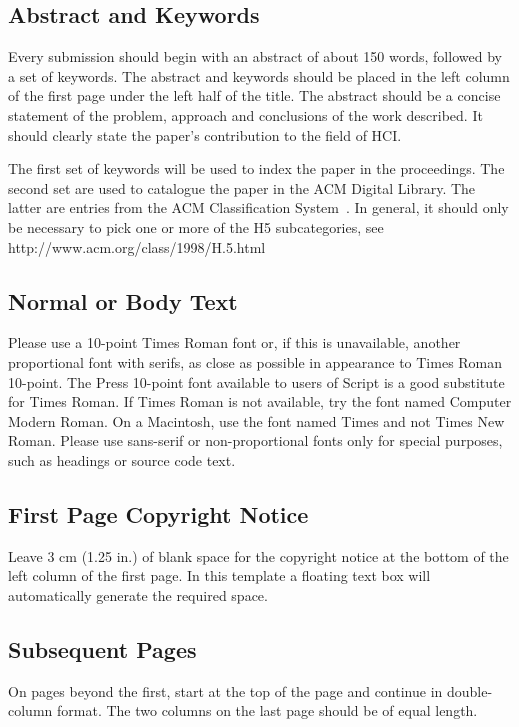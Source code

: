 \documentclass{chi2009}
\begin{document}
\subsection{Abstract and Keywords}

Every submission should begin with an abstract of about 150 words,
followed by a set of keywords. The abstract and keywords should be
placed in the left column of the first page under the left half of the
title. The abstract should be a concise statement of the problem,
approach and conclusions of the work described.  It should clearly
state the paper's contribution to the field of HCI.

The first set of keywords will be used to index the paper in the
proceedings. The second set are used to catalogue the paper in the ACM
Digital Library. The latter are entries from the ACM Classification
System~\cite{acm_categories}.  In general, it should only be necessary
to pick one or more of the H5 subcategories, see
http://www.acm.org/class/1998/H.5.html

\subsection{Normal or Body Text}

Please use a 10-point Times Roman font or, if this is unavailable,
another proportional font with serifs, as close as possible in
appearance to Times Roman 10-point. The Press 10-point font available
to users of Script is a good substitute for Times Roman. If Times
Roman is not available, try the font named Computer Modern Roman. On a
Macintosh, use the font named Times and not Times New Roman. Please
use sans-serif or non-proportional fonts only for special purposes,
such as headings or source code text.

\subsection{First Page Copyright Notice}

Leave 3 cm (1.25 in.) of blank space for the copyright notice at the
bottom of the left column of the first page. In this template a
floating text box will automatically generate the required space.

\subsection{Subsequent Pages}

On pages beyond the first, start at the top of the page and continue
in double-column format.  The two columns on the last page should be
of equal length.
\end{document}

